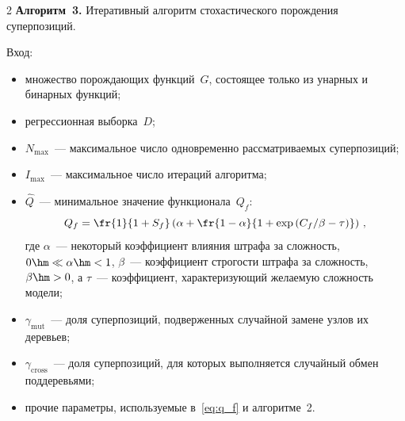 \begin{multicols}{2}
\noindent
\textbf{Алгоритм~3.}
  Итеративный алгоритм стохастического порождения суперпозиций.

  Вход:
  \begin{itemize}
    \item множество порождающих функций~$G$, со\-сто\-ящее только из унарных
      и бинарных функций;
    \item регрессионная выборка~$D$;
    \item $N_{\max}$~--- максимальное число одновременно рассматриваемых
      суперпозиций;
    \item $I_{\max}$~--- максимальное число итераций алгоритма;
    \item $\hat{Q}$~--- минимальное значение функционала~$Q_f$:
    \begin{equation}
  \label{eq:q_f}
  Q_f = \fr{1}{1 + S_f} \left(\alpha + \fr{1 - \alpha}
  {1 + \exp \left({C_f}/{\beta} - \tau\right)}\right)\,,
\end{equation}
где $\alpha$~--- некоторый коэффициент влияния штрафа за сложность, $0 \hm\ll \alpha \hm< 1$,
$\beta$~--- коэффициент строгости штрафа за сложность, $\beta \hm> 0$, а
$\tau$~--- коэффициент, характеризующий желаемую сложность модели;
    \item $\gamma_{\mathrm{mut}}$~--- доля суперпозиций, подверженных случайной
      замене узлов их деревьев;
    \item $\gamma_{\mathrm{cross}}$~--- доля суперпозиций, для которых выполняется
      случайный обмен поддеревьями;
    \item прочие параметры, используемые в~\eqref{eq:q_f} и алгоритме~2.
  \end{itemize}



\end{multicols}
